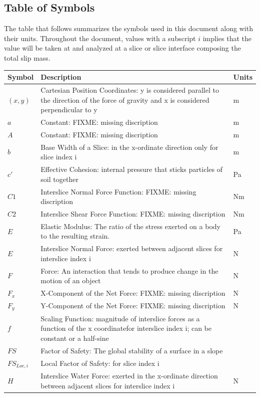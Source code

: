 \documentclass[12pt]{article}
\begin{document}
\subsection{Table of Symbols}
\label{Sec:TablofSymb}
The table that follows summarizes the symbols used in this document along with their units. Throughout the document, values with a subscript $i$ implies that the value will be taken at and analyzed at a slice or slice interface composing the total slip mass.
\begin{longtable*}{l l l}
\toprule
Symbol & Description & Units
\\
\midrule
$(x,y)$ & Cartesian Position Coordinates: y is considered parallel to the direction of the force of gravity and x is considered perpendicular to y & m
\\
$a$ & Constant: FIXME: missing discription & m
\\
$A$ & Constant: FIXME: missing discription & m
\\
$b$ & Base Width of a Slice: in the x-ordinate direction only for slice index i & m
\\
$c'$ & Effective Cohesion: internal pressure that sticks particles of soil together & Pa
\\
$C1$ & Interslice Normal Force Function: FIXME: missing discription & Nm
\\
$C2$ & Interslice Shear Force Function: FIXME: missing discription & Nm
\\
$E$ & Elastic Modulus: The ratio of the stress exerted on a body to the resulting strain. & Pa
\\
$E$ & Interslice Normal Force: exerted between adjacent slices for interslice index i & N
\\
$F$ & Force: An interaction that tends to produce change in the motion of an object & N
\\
$F_{x}$ & X-Component of the Net Force: FIXME: missing discription & N
\\
$F_{y}$ & Y-Component of the Net Force: FIXME: missing discription & N
\\
$f$ & Scaling Function: magnitude of interslice forces as a function of the x coordinatefor interslice index i; can be constant or a half-sine & 
\\
$FS$ & Factor of Safety: The global stability of a surface in a slope & 
\\
$FS_{Loc,i}$ & Local Factor of Safety: for slice index i & 
\\
$H$ & Interslice Water Force: exerted in the x-ordinate direction between adjacent slices for interslice index i & N

\end{longtable*}
\end{document}
